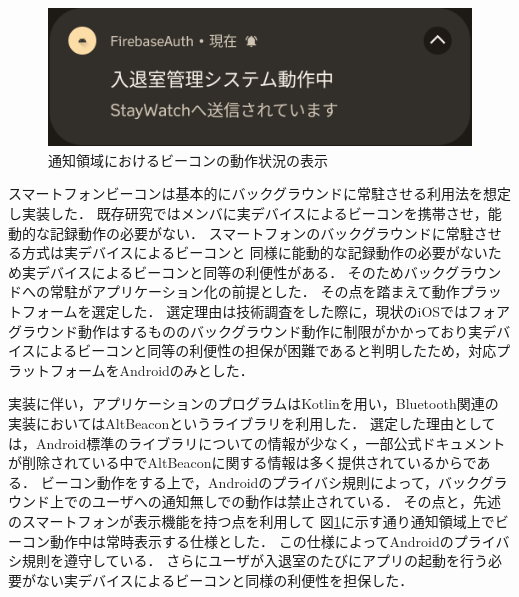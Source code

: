 \begin{figure}[tbh]
  \centering
  \includegraphics[width=12cm]{image/AppNofication.png}
  \caption{通知領域におけるビーコンの動作状況の表示}
  \label{fig:AppNofication}
\end{figure}


スマートフォンビーコンは基本的にバックグラウンドに常駐させる利用法を想定し実装した．
既存研究ではメンバに実デバイスによるビーコンを携帯させ，能動的な記録動作の必要がない．
スマートフォンのバックグラウンドに常駐させる方式は実デバイスによるビーコンと
同様に能動的な記録動作の必要がないため実デバイスによるビーコンと同等の利便性がある．
そのためバックグラウンドへの常駐がアプリケーション化の前提とした．
その点を踏まえて動作プラットフォームを選定した．
選定理由は技術調査をした際に，現状のiOSではフォアグラウンド動作はするもののバックグラウンド動作に制限がかかっており実デバイスによるビーコンと同等の利便性の担保が困難であると判明したため，対応プラットフォームをAndroidのみとした．

実装に伴い，アプリケーションのプログラムはKotlinを用い，Bluetooth関連の実装においてはAltBeaconというライブラリを利用した．
選定した理由としては，Android標準のライブラリについての情報が少なく，一部公式ドキュメントが削除されている中でAltBeaconに関する情報は多く提供されているからである．
ビーコン動作をする上で，Androidのプライバシ規則によって，バックグラウンド上でのユーザへの通知無しでの動作は禁止されている．
その点と，先述のスマートフォンが表示機能を持つ点を利用して 図\ref{fig:AppNofication}に示す通り通知領域上でビーコン動作中は常時表示する仕様とした．
この仕様によってAndroidのプライバシ規則を遵守している．
さらにユーザが入退室のたびにアプリの起動を行う必要がない実デバイスによるビーコンと同様の利便性を担保した．



